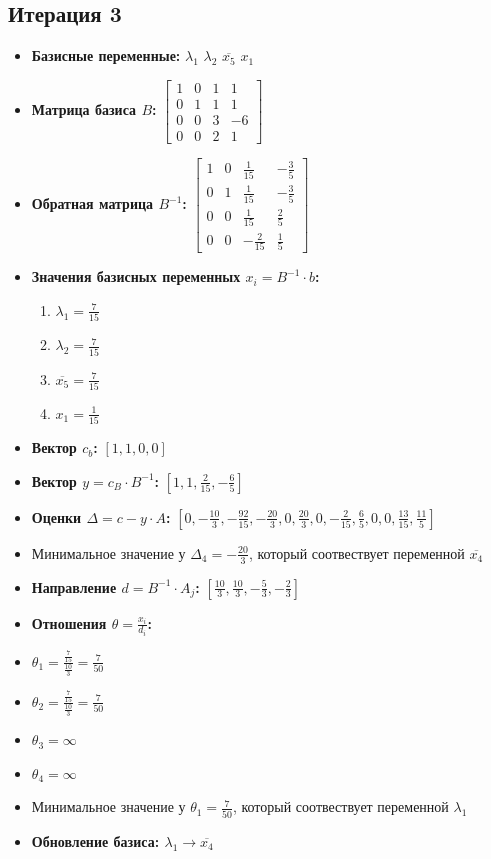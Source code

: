 \begin{itemize}
\subsection*{Итерация 3}
\begin{itemize}
\item \textbf{Базисные переменные:}
$\lambda_1$
$\lambda_2$
$\overline{x_{5}}$
$x_{1}$
\item \textbf{Матрица базиса $B$:}
$\left[\begin{matrix}1 & 0 & 1 & 1\\0 & 1 & 1 & 1\\0 & 0 & 3 & -6\\0 & 0 & 2 & 1\end{matrix}\right]$
\item \textbf{Обратная матрица $B^{-1}$:}
$\left[\begin{matrix}1 & 0 & \frac{1}{15} & - \frac{3}{5}\\0 & 1 & \frac{1}{15} & - \frac{3}{5}\\0 & 0 & \frac{1}{15} & \frac{2}{5}\\0 & 0 & - \frac{2}{15} & \frac{1}{5}\end{matrix}\right]$
\item \textbf{Значения базисных переменных $ x_i = B^{-1} \cdot b$:}
\begin{enumerate}
\item $\lambda_1 = \frac{7}{15}$
\item $\lambda_2 = \frac{7}{15}$
\item $\overline{x_{5}} = \frac{7}{15}$
\item $x_{1} = \frac{1}{15}$
\end{enumerate}
\item \textbf{Вектор $c_b$:}
$[1, 1, 0, 0]$
\item \textbf{Вектор $y = c_B \cdot B^{-1}$:}
$[1, 1, \frac{2}{15}, - \frac{6}{5}]$
\item \textbf{Оценки $\Delta = c - y \cdot A$:}
$[0, - \frac{10}{3}, - \frac{92}{15}, - \frac{20}{3}, 0, \frac{20}{3}, 0, - \frac{2}{15}, \frac{6}{5}, 0, 0, \frac{13}{15}, \frac{11}{5}]$
\item Минимальное значение у  $\Delta_{4} = - \frac{20}{3}$, который соотвествует переменной $\overline{x_{4}}$
\item \textbf{Направление $d = B^{-1} \cdot A_j$:}
$[\frac{10}{3}, \frac{10}{3}, - \frac{5}{3}, - \frac{2}{3}]$
\item \textbf{Отношения $\theta = \frac{x_i}{d_i}$:}
\item $\theta_{1} = \frac{\frac{7}{15}}{\frac{10}{3}} = \frac{7}{50}$
\item $\theta_{2} = \frac{\frac{7}{15}}{\frac{10}{3}} = \frac{7}{50}$
\item $\theta_{3} = \infty$
\item $\theta_{4} = \infty$
\item Минимальное значение у  $\theta_{1} = \frac{7}{50}$, который соотвествует переменной $\lambda_1$
\item \textbf{Обновление базиса: $\lambda_1 \rightarrow \overline{x_{4}}$}
\end{itemize}
\newpage

\end{itemize}
